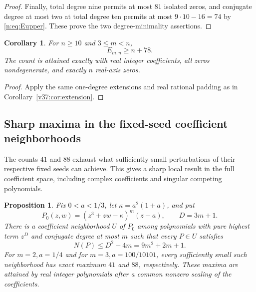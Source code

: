 \documentclass[UTF8,11pt]{ctexart}
\newtheorem{prop}[thm]{Proposition}
\newtheorem{cor}[thm]{Corollary}
\theoremstyle{definition}
\numberwithin{equation}{section}
\begin{document}
\begin{proof}
Finally, total degree nine permits at most $81$ isolated zeros,
and conjugate degree at most two at total degree ten permits
at most $9\cdot10-16=74$ by \eqref{n:eq:Eupper}.
These prove the two degree-minimality assertions.
\end{proof}

\begin{cor}\label{v38:cor:extension}
For $n\ge10$ and $3\le m<n$,
\[
                              E_{m,n}\ge n+78.
\]
The count is attained exactly with real integer coefficients,
all zeros nondegenerate, and exactly $n$ real-axis zeros.
\end{cor}
\begin{proof}
Apply the same one-degree extensions and real rational padding
as in Corollary~\ref{v37:cor:extension}.
\end{proof}


\subsection{Sharp maxima in the fixed-seed coefficient neighborhoods}
\label{v38:sec:localsharp}

The counts $41$ and $88$ exhaust what sufficiently small
perturbations of their respective fixed seeds can achieve.
This gives a sharp local result in the full coefficient space,
including complex coefficients and singular competing polynomials.

\begin{prop}\label{v38:prop:localsharp}
Fix $0<a<1/3$, let $\kappa=a^2(1+a)$, and put
\[
 P_0(z,w)=(z^3+zw-\kappa)^m(z-a),\qquad D=3m+1.
\]
There is a coefficient neighborhood $U$ of $P_0$ among
polynomials with pure highest term $z^D$ and conjugate degree
at most $m$ such that every $P\in U$ satisfies
\begin{equation}\label{v38:eq:localupper}
                     N(P)\le D^2-4m=9m^2+2m+1.
\end{equation}
For $m=2,a=1/4$ and for $m=3,a=100/10101$, every sufficiently
small such neighborhood has exact maximum $41$ and $88$,
respectively. These maxima are attained by real integer
polynomials after a common nonzero scaling of the coefficients.
\end{prop}
\end{document}
